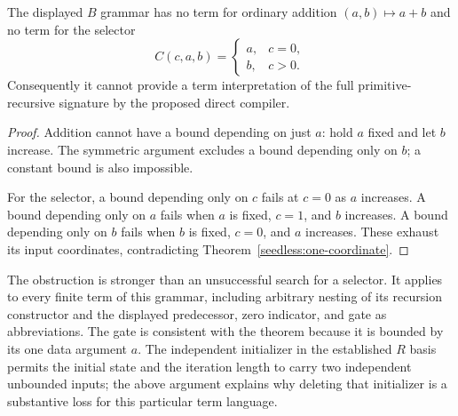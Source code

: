 
\begin{corollary}
\label{seedless:no-selector}
The displayed $B$ grammar has no term for ordinary addition
$(a,b)\mapsto a+b$ and no term for the selector
\[
 C(c,a,b)=
 \begin{cases}
 a,&c=0,\\
 b,&c>0.
 \end{cases}
\]
Consequently it cannot provide a term interpretation of the full
primitive-recursive signature by the proposed direct compiler.
\end{corollary}
\begin{proof}
Addition cannot have a bound depending on just $a$: hold $a$ fixed and
let $b$ increase. The symmetric argument excludes a bound depending
only on $b$; a constant bound is also impossible.

For the selector, a bound depending only on $c$ fails at $c=0$ as $a$
increases. A bound depending only on $a$ fails when $a$ is fixed,
$c=1$, and $b$ increases. A bound depending only on $b$ fails when
$b$ is fixed, $c=0$, and $a$ increases. These exhaust its input
coordinates, contradicting Theorem~\ref{seedless:one-coordinate}.
\end{proof}

The obstruction is stronger than an unsuccessful search for a selector.
It applies to every finite term of this grammar, including arbitrary
nesting of its recursion constructor and the displayed predecessor,
zero indicator, and gate as abbreviations. The gate is consistent with
the theorem because it is bounded by its one data argument $a$.
The independent initializer in the established $R$ basis permits the
initial state and the iteration length to carry two independent
unbounded inputs; the above argument explains why deleting that
initializer is a substantive loss for this particular term language.
